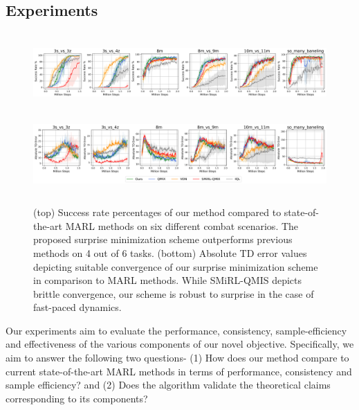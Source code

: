\documentclass{article}
\begin{document}
\begin{multicols}{2}
\section{Experiments}
\begin{figure}[ht]
  \centering
  \includegraphics[height=3cm,width=20cm]{rewards.png}
  \includegraphics[height=3cm,width=20cm]{tderror.png}
  \caption{(top) Success rate percentages of our method compared to state-of-the-art MARL methods on six different combat scenarios. The proposed surprise minimization scheme outperforms previous methods on 4 out of 6 tasks. (bottom) Absolute TD error values depicting suitable convergence of our surprise minimization scheme in comparison to MARL methods. While SMiRL-QMIS depicts brittle convergence, our scheme is robust to surprise in the case of fast-paced dynamics.}
  \label{fig:results}
\end{figure}
Our experiments aim to evaluate the performance, consistency, sample-efficiency and effectiveness of
the various components of our novel objective. Specifically, we aim to answer the following two questions- (1)
How does our method compare to current state-of-the-art MARL methods in terms of performance,
consistency and sample efficiency? and (2) Does the algorithm validate the theoretical claims corresponding to its
components?

\end{multicols}
\end{document}
